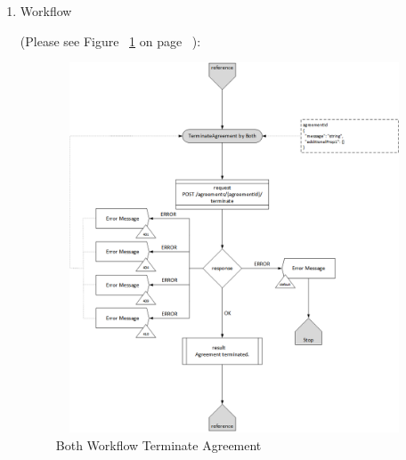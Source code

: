 \begin{enumerate}
\begin{tcolorbox}[boxrule=0pt, frame empty]
\begin{verbatim}
\end{verbatim}
\end{tcolorbox}


\item Workflow

(Please see Figure ~\ref{fig:BTA} on page ~\pageref{fig:BTA}):

\begin{figure}[H]
    \centering
    \includegraphics[width=11cm,height=11cm,angle=0]{./diag/Workflow/Market/TerminateAgreement-B-Workflow.png}
    \caption{Both Workflow Terminate Agreement  }
	\label{fig:BTA}
\end{figure}

\end{enumerate}

\newpage

